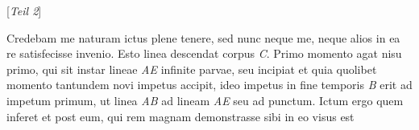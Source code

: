 \begin{center} [\textit{Teil 2}]
\end{center}
\pend
\count{}
\count{}
\pstart
\noindent
Credebam me naturam ictus plene tenere, sed nunc neque me, neque alios in ea re satisfecisse invenio. Esto linea  descendat corpus \textit{C}. Primo momento agat nisu primo, qui sit instar lineae \textit{AE} infinite parvae, seu incipiat  et quia quolibet momento tantundem novi impetus\protect{} accipit, ideo impetus in fine temporis \textit{B} erit ad impetum\protect{} primum, ut linea \textit{AB} ad lineam \textit{AE} seu ad punctum. Ictum\protect{} ergo quem inferet %
{} et post eum, qui rem magnam demonstrasse sibi in eo visus est %
